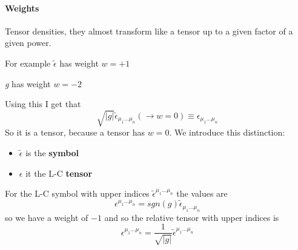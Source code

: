 \paragraph{Weights}
Tensor densities, they almost transform like a tensor up to a given factor of a given power. \par
For example $\tilde{\epsilon }$ has weight $w=+1$\par
\emph{g} has weight $w=-2$\par
Using this I get that
\[
	\sqrt{|g|} \tilde{\epsilon }_{\mu _{1}\ldots \mu_{n}} (\to w=0) \equiv \epsilon_{\mu_{1}\ldots  \mu _{n}}
\]
So it is a tensor, because a tensor has $w=0$. 
We introduce this distinction:
\begin{itemize}
	\item $\tilde{\epsilon }$ is the \textbf{symbol}
	\item $\epsilon $ it the L-C \textbf{tensor} 
\end{itemize}

For the L-C symbol with upper indices $\tilde{\epsilon}^{\mu _{1}\ldots \mu _{n}}$ the values are
\[
\epsilon ^{\mu _{1}\ldots \mu _{n}} = sgn\left( g \right) \tilde{\epsilon }_{\mu _{1}\ldots \mu _{n}}
\]
so we have a weight of $-1$ and so the relative tensor with upper indices is 
\[
	\epsilon ^{\mu _{1}\ldots \mu _{n}} = \frac{1}{\sqrt{|g|}} \tilde{\epsilon }^{\mu _{1}\ldots \mu _{n}}
\]



